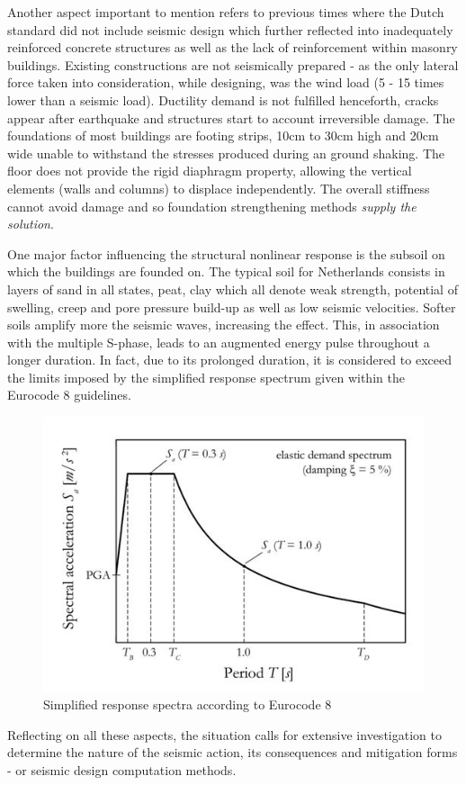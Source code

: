 \documentclass[12pt,a4paper]{report}
\begin{document}
Another aspect important to mention refers to previous times where the Dutch standard did not include seismic design which further reflected into inadequately reinforced concrete structures as well as the lack of reinforcement within masonry buildings. Existing constructions are not seismically prepared - as the only lateral force taken into consideration, while designing, was the wind load (5 - 15 times lower than a seismic load). Ductility demand is not fulfilled henceforth, cracks appear after earthquake and structures start to account irreversible damage.  The foundations of most buildings are footing strips, 10cm to 30cm high and 20cm wide unable to withstand the stresses produced during an ground shaking. The floor does not provide the rigid diaphragm property, allowing the vertical elements (walls and columns) to displace independently. The overall stiffness cannot avoid damage and so foundation strengthening methods \textit{supply the solution}. 

One major factor influencing the structural nonlinear response is the subsoil on which the buildings are founded on. The typical soil for Netherlands consists in layers of sand in all states, peat, clay which all denote weak strength, potential of swelling, creep and pore pressure build-up as well as low seismic velocities. Softer soils amplify more the seismic waves, increasing the effect. This, in association with the multiple S-phase, leads to an augmented energy pulse throughout a longer duration. In fact, due to its prolonged duration, it is considered to exceed the limits imposed by the simplified response spectrum given within the Eurocode 8 guidelines.
\begin{figure}[h!]
	\centering
	\includegraphics[width=0.42\linewidth]{"spectrum_code"}
	\caption{Simplified response spectra according to Eurocode 8}
	\label{SA}
\end{figure}

Reflecting on all these aspects, the situation calls for extensive investigation to determine the nature of the seismic action, its consequences and mitigation forms - or seismic design computation methods. 
\end{document}
